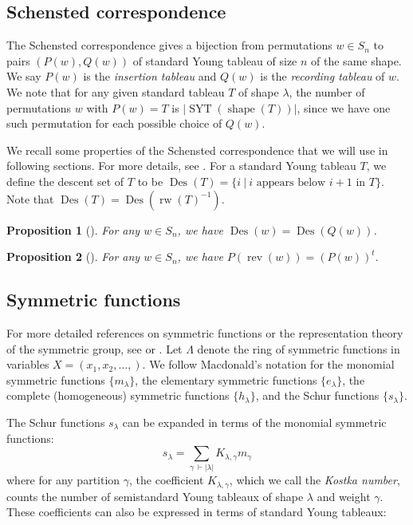 \documentclass[10pt]{amsart}
\theoremstyle{plain}
\theoremstyle{definition}
\theoremstyle{plain}
\theoremstyle{plain}
\newtheorem{prop}[prop]{Proposition}
\theoremstyle{remark}
\theoremstyle{plain}
\theoremstyle{plain}
\DeclareMathOperator{\syt}{SYT}
\DeclareMathOperator{\shape}{shape}
\DeclareMathOperator{\rev}{rev}
\DeclareMathOperator{\des}{Des}
\DeclareMathOperator{\rw}{rw}
\begin{document}
\subsection{Schensted correspondence}\label{subsec:RSK}
The Schensted correspondence gives a bijection from permutations $w\in S_n$ to pairs $(P(w),Q(w))$ of standard Young tableau of size $n$ of the same shape. We say $P(w)$ is the \textit{insertion tableau} and $Q(w)$ is the \textit{recording tableau} of $w$.
We note that for any given standard tableau $T$ of shape $\lambda$, the number of permutations $w$ with $P(w) = T$ is $|\syt(\shape(T))|$, since we have one such permutation for each possible choice of $Q(w)$.

We recall some properties of the Schensted correspondence that we will use in following sections. For more details, see \cite[Chapter 7]{EC2}. 
For a standard Young tableau $T$, we define the descent set of $T$ to be  $\des(T) = \{i  \ | \ i \text{ appears below } i+1 \text{ in } T\}.$
Note that $\des(T) = \des(\rw(T)^{-1})$.
\begin{prop}[{\cite[Lemma 7.23.11]{EC2}}]
    For any $w\in S_n$, we have $\des(w) = \des(Q(w))$. 
\end{prop}

\begin{prop}[{\cite[Corollary A1.2.11]{EC2}}]\label{thm:RSK rev}
For any $w\in S_n$, we have $P(\rev(w))= (P(w))^t.$
\end{prop}

\subsection{Symmetric functions}\label{subsec: symm functions}
For more detailed references on symmetric functions or the representation theory of the symmetric group, see \cite[Chapter 7]{EC2} or \cite{macdonald}.
Let $\Lambda$ denote the ring of symmetric functions in variables $X = (x_1,x_2,\dots, )$.
We follow Macdonald's notation \cite{macdonald} for the monomial symmetric functions $\{m_\lambda\}$, the elementary symmetric functions $\{e_\lambda\}$, the complete (homogeneous) symmetric functions $\{h_\lambda\}$, and the Schur functions $\{s_\lambda\}$.

The Schur functions $s_\lambda$ can be expanded in terms of the monomial symmetric functions:
\[s_\lambda  = \sum\limits_{\gamma \ \vdash |\lambda|} K_{\lambda,\gamma} m_{\gamma}\]
where for any partition $\gamma$, the coefficient $K_{\lambda,\gamma}$, which we call the \textit{Kostka number}, counts the number of semistandard Young tableaux of shape $\lambda$ and weight $\gamma$.
 These coefficients can also be expressed in terms of standard Young tableaux:
\end{document}
